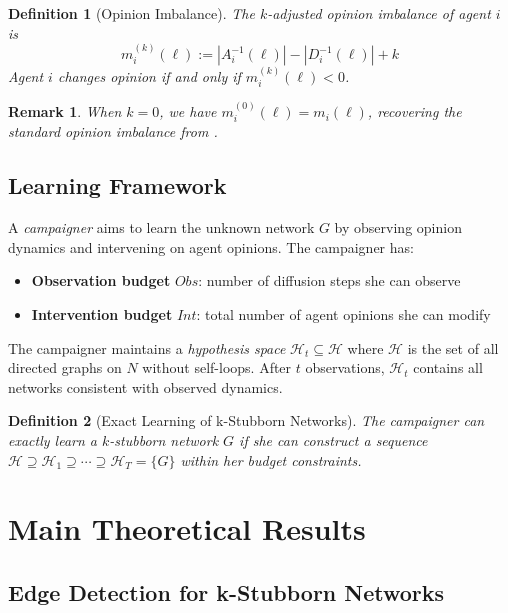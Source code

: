 \documentclass[conference]{IEEEtran}
\newtheorem{definition}{Definition}
\newtheorem{remark}{Remark}
\begin{document}
\begin{definition}[Opinion Imbalance]
The \emph{$k$-adjusted opinion imbalance} of agent $i$ is
\[
m_i^{(k)}(\ell) := |A_i^{-1}(\ell)| - |D_i^{-1}(\ell)| + k
\]
Agent $i$ changes opinion if and only if $m_i^{(k)}(\ell) < 0$.
\end{definition}

\begin{remark}
When $k=0$, we have $m_i^{(0)}(\ell) = m_i(\ell)$, recovering the standard opinion imbalance from \cite{chistikov2020convergence}.
\end{remark}

\subsection{Learning Framework}

A \emph{campaigner} aims to learn the unknown network $G$ by observing opinion dynamics and intervening on agent opinions. The campaigner has:
\begin{itemize}
\item \textbf{Observation budget} $Obs$: number of diffusion steps she can observe
\item \textbf{Intervention budget} $Int$: total number of agent opinions she can modify
\end{itemize}

The campaigner maintains a \emph{hypothesis space} $\mathcal{H}_t \subseteq \mathcal{H}$ where $\mathcal{H}$ is the set of all directed graphs on $N$ without self-loops. After $t$ observations, $\mathcal{H}_t$ contains all networks consistent with observed dynamics.

\begin{definition}[Exact Learning of k-Stubborn Networks]
\label{def:exact_learning_stubborn}
The campaigner can \emph{exactly learn} a $k$-stubborn network $G$ if she can construct a sequence $\mathcal{H} \supseteq \mathcal{H}_1 \supseteq \cdots \supseteq \mathcal{H}_T = \{G\}$ within her budget constraints.
\end{definition}

\section{Main Theoretical Results}
\label{sec:theory}

\subsection{Edge Detection for k-Stubborn Networks}
\end{document}
